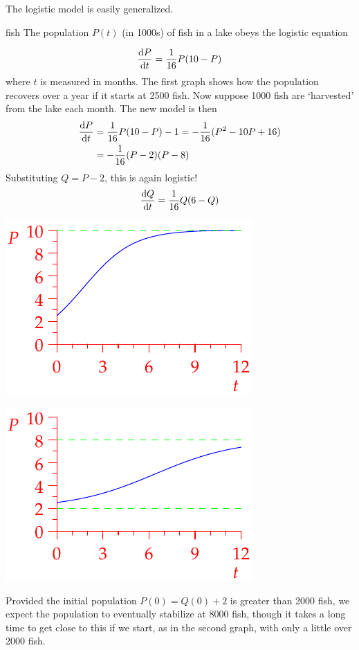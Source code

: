 The logistic model is easily generalized.

\begin{example}{}{fish}
	The population $P(t)$ (in 1000s) of fish in a lake obeys the logistic equation
	\begin{minipage}[t]{0.6\linewidth}\vspace{-10pt}
		\[
			\diff[P]{t}=\frac 1{16}P(10-P)
		\]
		where $t$ is measured in months. The first graph shows how the population recovers over a year if it starts at 2500 fish.\smallbreak
		Now suppose 1000 fish are `harvested' from the lake each month. The new model is then
		\begin{align*}
			\diff[P]{t}&=\frac 1{16}P(10-P)-1=-\frac 1{16}(P^2-10P+16)\\
			&=-\frac 1{16}(P-2)(P-8)
		\end{align*}
		Substituting $Q=P-2$, this is again logistic!
		\[
			\diff[Q]{t}=\frac 1{16}Q(6-Q)
		\]
	\end{minipage}
	\hfill
	\begin{minipage}[t]{0.39\linewidth}\vspace{0pt}
		\flushright\includegraphics{fish}\par
		\includegraphics{fish2}
	\end{minipage}
	Provided the initial population $P(0)=Q(0)+2$ is greater than 2000 fish, we expect the population to eventually stabilize at 8000 fish, though it takes a long time to get close to this if we start, as in the second graph, with only a little over 2000 fish.
\end{example}
\goodbreak



